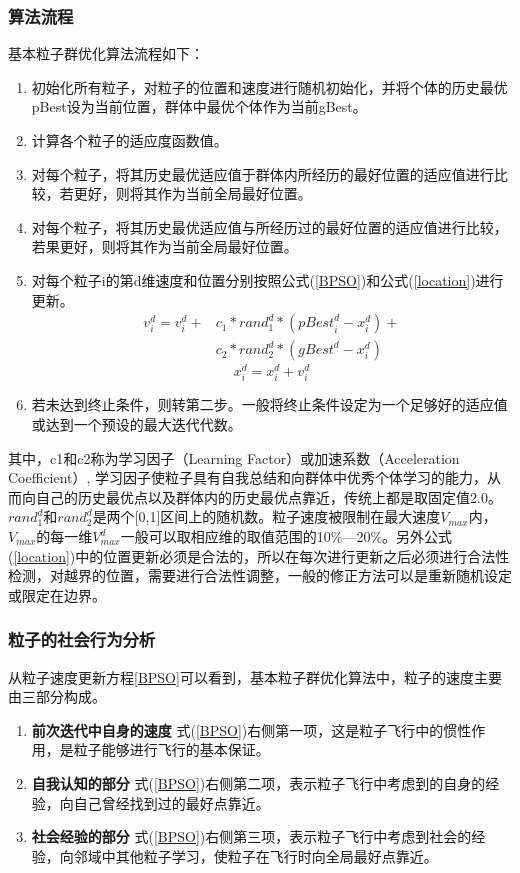 \subsubsection{算法流程}

基本粒子群优化算法流程如下：
\begin{enumerate}
	\item 初始化所有粒子，对粒子的位置和速度进行随机初始化，并将个体的历史最优pBest设为当前位置，群体中最优个体作为当前gBest。
	\item 计算各个粒子的适应度函数值。
	\item 对每个粒子，将其历史最优适应值于群体内所经历的最好位置的适应值进行比较，若更好，则将其作为当前全局最好位置。
	\item 对每个粒子，将其历史最优适应值与所经历过的最好位置的适应值进行比较，若果更好，则将其作为当前全局最好位置。
	\item 对每个粒子i的第d维速度和位置分别按照公式(\ref{BPSO})和公式(\ref{location})进行更新。
	\begin{equation}
	\begin{split}
	\label{BPSO}
	v_i^d=v_i^d+&c_1*{rand}_1^d*({pBest}_i^d-x_i^d )+\\
	&c_2*{rand}_2^d*({gBest}^d-x_i^d)
	\end{split}
	\end{equation}
	\begin{equation}
	\label{location}
	x_i^d=x_i^d+v_i^d
	\end{equation}
	
	\item 若未达到终止条件，则转第二步。一般将终止条件设定为一个足够好的适应值或达到一个预设的最大迭代代数。
\end{enumerate}

其中，c1和c2称为学习因子（Learning Factor）或加速系数（Acceleration Coefficient）, 学习因子使粒子具有自我总结和向群体中优秀个体学习的能力，从而向自己的历史最优点以及群体内的历史最优点靠近，传统上都是取固定值2.0。${rand}_1^d$和${rand}_2^d$是两个[0,1]区间上的随机数。粒子速度被限制在最大速度$V_{max}$内，$V_{max}$的每一维$V_{max}^d$一般可以取相应维的取值范围的10\%—20\%。另外公式(\ref{location})中的位置更新必须是合法的，所以在每次进行更新之后必须进行合法性检测，对越界的位置，需要进行合法性调整，一般的修正方法可以是重新随机设定或限定在边界。

\subsubsection{粒子的社会行为分析}
从粒子速度更新方程\ref{BPSO}可以看到，基本粒子群优化算法中，粒子的速度主要由三部分构成。
\begin{enumerate}
	\item \textbf{前次迭代中自身的速度}
	\noindent 式(\ref{BPSO})右侧第一项，这是粒子飞行中的惯性作用，是粒子能够进行飞行的基本保证。
	
	\item \textbf{自我认知的部分}
	\noindent 式(\ref{BPSO})右侧第二项，表示粒子飞行中考虑到的自身的经验，向自己曾经找到过的最好点靠近。
	
	\item \textbf{社会经验的部分}
	\noindent 式(\ref{BPSO})右侧第三项，表示粒子飞行中考虑到社会的经验，向邻域中其他粒子学习，使粒子在飞行时向全局最好点靠近。
\end{enumerate}
